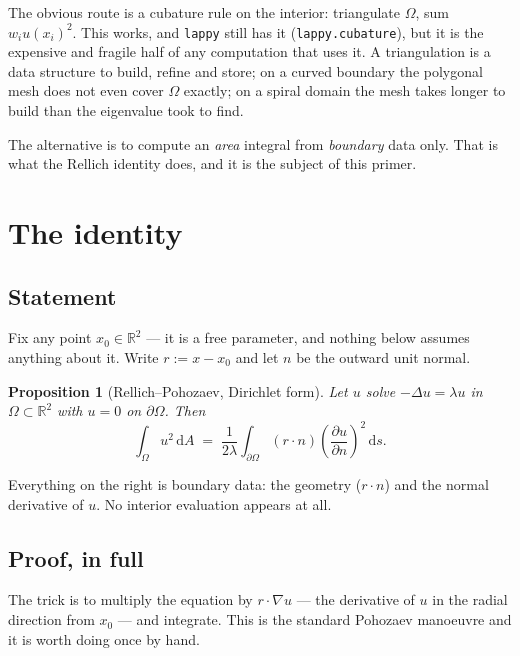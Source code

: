 \documentclass[11pt]{article}
\newtheorem{proposition}{Proposition}
\theoremstyle{definition}
\theoremstyle{remark}
\newcommand{\dd}{\,\mathrm{d}}
\newcommand{\Om}{\Omega}
\newcommand{\pd}[2]{\frac{\partial #1}{\partial #2}}
\newcommand{\R}{\mathbb{R}}
\newcommand{\code}[1]{\texttt{#1}}
\begin{document}
The obvious route is a cubature rule on the interior: triangulate $\Om$, sum
$w_i u(x_i)^2$. This works, and \code{lappy} still has it
(\code{lappy.cubature}), but it is the expensive and fragile half of any
computation that uses it. A triangulation is a data structure to build, refine
and store; on a curved boundary the polygonal mesh does not even cover $\Om$
exactly; on a spiral domain the mesh takes longer to build than the eigenvalue
took to find.

The alternative is to compute an \emph{area} integral from \emph{boundary} data
only. That is what the Rellich identity does, and it is the subject of this
primer.

\section{The identity}

\subsection{Statement}

Fix any point $x_0\in\R^2$ --- it is a free parameter, and nothing below assumes
anything about it. Write $r:=x-x_0$ and let $n$ be the outward unit normal.

\begin{proposition}[Rellich--Pohozaev, Dirichlet form]\label{prop:rellich}
Let $u$ solve $-\Delta u=\lambda u$ in $\Om\subset\R^2$ with $u=0$ on
$\partial\Om$. Then
\begin{equation}\label{eq:rellich}
  \int_\Om u^2 \dd A
  \;=\; \frac{1}{2\lambda}\int_{\partial\Om} (r\cdot n)
        \left(\pd{u}{n}\right)^{\!2} \dd s .
\end{equation}
\end{proposition}

Everything on the right is boundary data: the geometry ($r\cdot n$) and the
normal derivative of $u$. No interior evaluation appears at all.

\subsection{Proof, in full}

The trick is to multiply the equation by $r\cdot\nabla u$ --- the derivative of
$u$ in the radial direction from $x_0$ --- and integrate. This is the standard
Pohozaev manoeuvre and it is worth doing once by hand.
\end{document}
